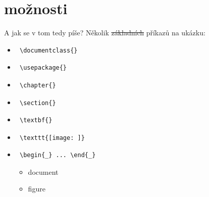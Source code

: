 \documentclass{beamer}
\begin{document}
\section{možnosti}
\begin{frame}[fragile]{A jak se v tom tedy píše?}
Několik \sout{základních} příkazů na ukázku:
\begin{itemize}
\item \begin{verbatim} \documentclass{} \end{verbatim}
\item \begin{verbatim} \usepackage{} \end{verbatim}
\item \begin{verbatim} \chapter{} \end{verbatim}
\item \begin{verbatim} \section{} \end{verbatim}
\item \begin{verbatim} \textbf{} \end{verbatim}
\item \begin{verbatim} \texttt{[image: ]} \end{verbatim}
\item \begin{verbatim} \begin{_} ... \end{_} \end{verbatim}
\begin{itemize}
    \item document
    \item figure
\end{itemize}
\end{itemize}
\end{frame}
\end{document}
